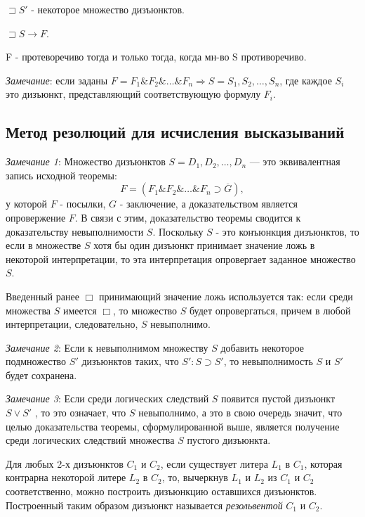 \documentclass[a4paper,12pt]{report}
\begin{document}
	$\sqsupset S'$ - некоторое множество дизъюнктов.\par
	$\sqsupset S \to F$.\par
	F - протеворечиво тогда и только тогда, когда мн-во S противоречиво. \\ \par

	\textit{Замечание}: если заданы $F = F_1 \& F_2 \& \ldots \& F_n \Rightarrow
	S = {S_1, S_2, \ldots , S_n}$, где каждое $S_i$ это дизъюнкт, представляющий
	соответствующую формулу $F_i$.


\subsection{Метод резолюций для исчисления высказываний}

	\textit{Замечание 1}: Множество дизъюнктов $S = {D_1, D_2, \ldots , D_n}$ —
	это эквивалентная запись исходной теоремы:
	$$ F = (F_1 \& F_2 \& \ldots \& F_n \supset \overline{G}),$$
	у которой $F$ - посылки, $G$ - заключение, а доказательством является
	опровержение $F$. В связи с этим, доказательство теоремы сводится к
	доказательству невыполнимости $S$. Поскольку $S$ - это конъюнкция дизъюнктов,
	то если в множестве $S$ хотя бы один дизъюнкт принимает значение ложь в
	некоторой интерпретации, то эта интерпретация опровергает заданное множество
	$S$.\par
	Введенный ранее $\Box$ принимающий значение ложь используется так: если среди
	множества $S$ имеется $\Box$, то множество $S$ будет опровергаться, причем в
	любой интерпретации, следовательно, $S$ невыполнимо.\\ \par
	\textit{Замечание 2}: Если к невыполнимом множеству $S$ добавить некоторое
	подмножество $S'$ дизъюнктов таких, что $S' : S \supset S'$, то
	невыполнимость $S$ и $S'$ будет сохранена.\\ \par

	\textit{Замечание 3}: Если среди логических следствий $S$ появится пустой
	дизъюнкт $S \vee S'$ , то это означает, что $S$ невыполнимо, а это в свою
	очередь значит, что целью доказательства теоремы, сформулированной выше,
	является получение среди логических следствий множества $S$ пустого
	дизъюнкта. \\ \par

	Для любых 2-х дизъюнктов $C_1$ и $C_2$, если существует литера $L_1$ в $C_1$,
	которая контрарна некоторой литере $L_2$ в $C_2$, то, вычеркнув $L_1$ и $L_2$
	из $C_1$ и $C_2$ соответственно, можно построить дизъюнкцию оставшихся
	дизъюнктов. Построенный таким образом дизъюнкт называется
	\textit{резольвентой} $C_1$ и $C_2$. \\ \par
\end{document}
